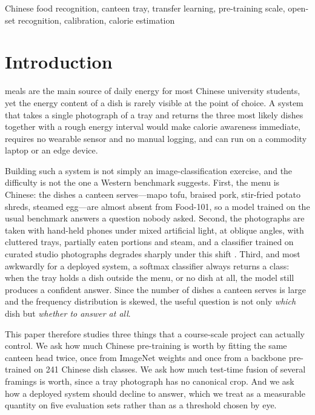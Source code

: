 \documentclass[conference]{IEEEtran}
\begin{document}
\begin{IEEEkeywords}
Chinese food recognition, canteen tray, transfer learning, pre-training scale,
open-set recognition, calibration, calorie estimation
\end{IEEEkeywords}

\section{Introduction}
 meals are the main source of daily energy for most
Chinese university students, yet the energy content of a dish is rarely visible
at the point of choice. A system that takes a single photograph of a tray and
returns the three most likely dishes together with a rough energy interval would
make calorie awareness immediate, requires no wearable sensor and no manual
logging, and can run on a commodity laptop or an edge device.

Building such a system is not simply an image-classification exercise, and the
difficulty is not the one a Western benchmark suggests. First, the menu is
Chinese: the dishes a canteen serves---mapo tofu, braised pork, stir-fried potato
shreds, steamed egg---are almost absent from Food-101, so a model trained on the
usual benchmark answers a question nobody asked. Second, the photographs are
taken with hand-held phones under mixed artificial light, at oblique angles, with
cluttered trays, partially eaten portions and steam, and a classifier trained on
curated studio photographs degrades sharply under this shift
\cite{hendrycks2019robustness}. Third, and most awkwardly for a deployed system,
a softmax classifier always returns a class: when the tray holds a dish outside
the menu, or no dish at all, the model still produces a confident answer. Since
the number of dishes a canteen serves is large and the frequency distribution is
skewed, the useful question is not only \emph{which} dish but \emph{whether to
answer at all}.

This paper therefore studies three things that a course-scale project can
actually control. We ask how much Chinese pre-training is worth by fitting the
same canteen head twice, once from ImageNet weights and once from a backbone
pre-trained on 241 Chinese dish classes. We ask how much test-time fusion of
several framings is worth, since a tray photograph has no canonical crop. And we
ask how a deployed system should decline to answer, which we treat as a
measurable quantity on five evaluation sets rather than as a threshold chosen by
eye.
\end{document}
